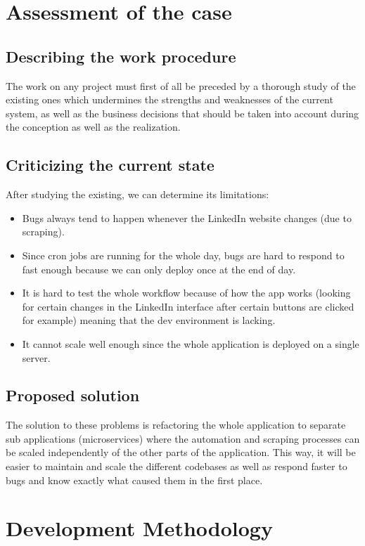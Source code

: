 \section{Assessment of the case}
\subsection{Describing the work procedure}
The work on any project must first of all be preceded by a thorough study of the existing ones which undermines the strengths and weaknesses of the current system, as well as the business decisions that should be taken into account during the conception as well as the realization.
\subsection{Criticizing the current state}
After studying the existing, we can determine its limitations:
\begin{itemize}
    \item Bugs always tend to happen whenever the LinkedIn website changes (due to scraping).
    \item Since cron jobs are running for the whole day, bugs are hard to respond to fast enough because we can only deploy once at the end of day.
    \item It is hard to test the whole workflow because of how the app works (looking for certain changes in the LinkedIn interface after certain buttons are clicked for example) meaning that the dev environment is lacking.
    \item It cannot scale well enough since the whole application is deployed on a single server.
\end{itemize}
\subsection{Proposed solution}
The solution to these problems is refactoring the whole application to separate sub applications (microservices) where the automation and scraping processes can be scaled independently of the other parts of the application.
This way, it will be easier to maintain and scale the different codebases as well as respond faster to bugs and know exactly what caused them in the first place.

\newpage

\section{Development Methodology}
